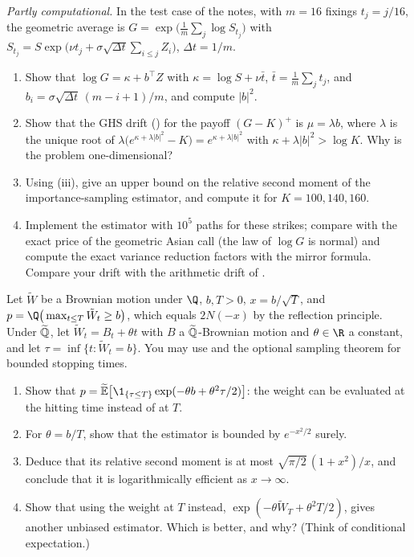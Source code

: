 \begin{exercise}\label{ex:is-geometric}
\hard \emph{Partly computational.} In the test case of the notes, with $m=16$ fixings
$t_j=j/16$, the geometric average is $G=\exp\big(\frac1m\sum_j\log S_{t_j}\big)$ with
$S_{t_j}=S\exp\big(\nu t_j+\sigma\sqrt{\Delta t}\sum_{i\le j}Z_i\big)$, $\Delta t=1/m$.
\begin{enumerate}[label=(\alph*)]
  \item Show that $\log G=\kappa+b^\top Z$ with $\kappa=\log S+\nu\bar t$,
    $\bar t=\frac1m\sum_jt_j$, and $b_i=\sigma\sqrt{\Delta t}\,(m-i+1)/m$, and compute $|b|^2$.
  \item Show that the GHS drift () for the payoff $(G-K)^+$ is
    $\mu=\lambda b$, where $\lambda$ is the unique root of
    $\lambda\big(e^{\kappa+\lambda|b|^2}-K\big)=e^{\kappa+\lambda|b|^2}$ with
    $\kappa+\lambda|b|^2>\log K$. Why is the problem one-dimensional?
  \item Using (iii), give an upper bound on the relative second
    moment of the importance-sampling estimator, and compute it for $K=100,140,160$.
  \item Implement the estimator with $10^5$ paths for these strikes; compare with the exact price
    of the geometric Asian call (the law of $\log G$ is normal) and compute the exact variance
    reduction factors with the mirror formula. Compare your drift with the arithmetic drift of
    .
\end{enumerate}
\end{exercise}

\begin{exercise}\label{ex:is-first-passage}
\hard Let $\tilde W$ be a Brownian motion under $\Q$, $b,T>0$, $x=b/\sqrt T$, and
$p=\Q\big(\max_{t\le T}\tilde W_t\ge b\big)$, which equals $2N(-x)$ by the reflection
principle. Under $\widetilde{\mathbb Q}$, let $\tilde W_t=B_t+\theta t$ with $B$ a $\widetilde{\mathbb Q}$-Brownian motion and
$\theta\in\R$ a constant, and let $\tau=\inf\{t:\tilde W_t=b\}$. You may use
 and the optional sampling theorem for bounded stopping times.
\begin{enumerate}[label=(\alph*)]
  \item Show that $p=\Et\big[\1_{\{\tau\le T\}}\exp(-\theta b+\theta^2\tau/2)\big]$: the weight
    can be evaluated at the hitting time instead of at $T$.
  \item For $\theta=b/T$, show that the estimator is bounded by $e^{-x^2/2}$ surely.
  \item Deduce that its relative second moment is at most $\sqrt{\pi/2}\,(1+x^2)/x$, and conclude
    that it is logarithmically efficient as $x\to\infty$.
  \item Show that using the weight at $T$ instead, $\exp(-\theta\tilde W_T+\theta^2T/2)$, gives
    another unbiased estimator. Which is better, and why? (Think of conditional expectation.)
\end{enumerate}
\end{exercise}

